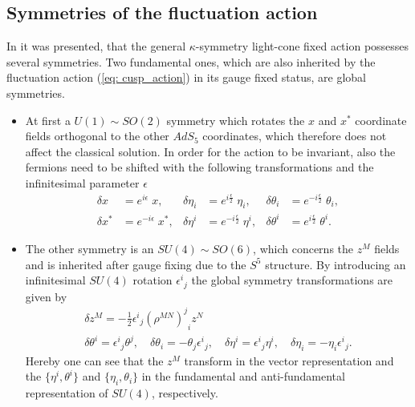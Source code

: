 \subsection{Symmetries of the fluctuation action}
In \cite{Metsaev:2000yu} it was presented, that the general $\kappa$-symmetry light-cone fixed action possesses several symmetries. Two fundamental ones, which are also inherited by the fluctuation action (\ref{eq: cusp_action}) in its gauge fixed status, are global symmetries.
%
\begin{itemize}
\item At first a $U(1)\sim SO(2)$ symmetry which rotates the $x$ and $x^{*}$ coordinate fields orthogonal to the other $AdS_{5}$ coordinates, which therefore does not affect the classical solution. In order for the action to be invariant, also the fermions need to be shifted with the following transformations and the infinitesimal parameter $\epsilon$
%
%
\begin{align*}
\delta x &= e^{i\epsilon}\; x, &  \delta\eta_{i}&= e^{i\frac{\epsilon}{2}}\; \eta_{i}, &  \delta\theta_{i} &= e^{-i\frac{\epsilon}{2}}\; \theta_{i},\\
\delta x^{*} &= e^{-i\epsilon}\; x^{*}, &  \delta\eta^{i}&= e^{-i\frac{\epsilon}{2}}\; \eta^{i}, &  \delta\theta^{i} &= e^{i\frac{\epsilon}{2}}\; \theta^{i}.
\end{align*}
%
%
\item The other symmetry is an $SU(4)\sim SO(6)$, which concerns the $z^{M}$ fields and is inherited after gauge fixing due to the $S^{5}$ structure. By introducing an infinitesimal $SU(4)$ rotation ${\epsilon^{i}}_{j}$ the global symmetry transformations are given by
%
%
\begin{gather*}
\delta z^{M} = -\frac{1}{2} {\epsilon^{i}}_{j} {(\rho^{MN})^{j}}_{i} z^{N} \\
\delta \theta^{i} = {\epsilon^{i}}_{j} \theta ^{j}, \quad \delta \theta_{i} = - \theta_{j} {\epsilon^{i}}_{j}, \quad  
\delta \eta ^{i} = {\epsilon^{i}}_{j} \eta^{i}, \quad  \delta \eta_{i}= - \eta_{i} {\epsilon^{i}}_{j}.
\end{gather*}
%
%
Hereby one can see that the $z^{M}$ transform in the vector representation and the $\lbrace \eta^{i},\theta^{i}\rbrace$ and $\lbrace \eta_{i},\theta_{i}\rbrace$ in the fundamental and anti-fundamental representation of $SU(4)$, respectively.
\end{itemize}